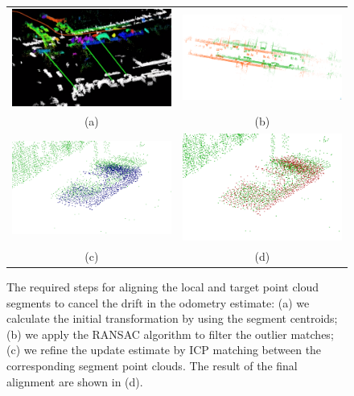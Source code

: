 \documentclass[letterpaper, 10 pt, conference]{ieeeconf}  %
\begin{document}
\begin{figure}[ht!]
    \begin{center} \begin{tabular}{c@{\hspace{1mm}}c@{\hspace{1mm}}}
        \includegraphics*[width=0.44\linewidth]{figures/match_recognition.png} &
        \includegraphics*[width=0.44\linewidth]{figures/prior_transform.png} \\
        (a) & (b) \\
        \includegraphics*[width=0.44\linewidth]{figures/after_align.png} &
        \includegraphics*[width=0.44\linewidth]{figures/icp_refine.png} \\
         (c) & (d)\\
    \end{tabular}
        \caption{The required steps for aligning the local and target point cloud segments to cancel the drift in the odometry estimate: (a) we calculate the initial transformation by using the segment centroids; (b) we apply the RANSAC algorithm to filter the outlier matches; (c) we refine the update estimate by ICP matching between the corresponding segment point clouds. The result of the final alignment are shown in (d).}
    \label{fig:pose_refine}
    \end{center}
\end{figure}
\end{document}

